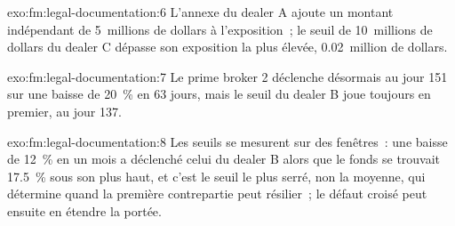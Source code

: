 \begin{solution}{exo:fm:legal-documentation:6}
L'annexe du dealer A ajoute un montant indépendant de 5~millions de dollars à l'exposition~; le seuil de 10~millions de dollars du dealer C
dépasse son exposition la plus élevée, 0.02~million de dollars.
\end{solution}

\begin{solution}{exo:fm:legal-documentation:7}
Le prime broker 2 déclenche désormais au jour 151 sur une baisse de 20~\% en 63 jours, mais le seuil du dealer B joue toujours en premier, au jour 137.
\end{solution}

\begin{solution}{exo:fm:legal-documentation:8}
Les seuils se mesurent sur des fenêtres~: une baisse de 12~\% en un mois a déclenché celui du dealer B alors que le fonds se trouvait 17.5~\% sous son plus haut, et
c'est le seuil le plus serré, non la moyenne, qui détermine quand la première contrepartie peut résilier~; le défaut croisé peut ensuite en étendre la portée.
\end{solution}

